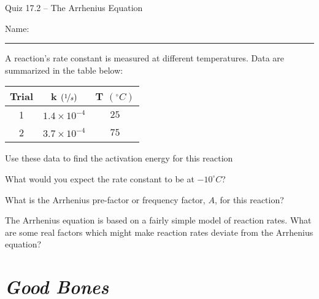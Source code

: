\documentclass[11pt, letterpaper]{memoir}
\begin{document}
	\begin{center}
		{\large Quiz 17.2 -- The Arrhenius Equation}
	\end{center}
	{\large Name: \rule[-1mm]{4in}{.1pt} 

\noindent 
A reaction's rate constant is measured at different temperatures. Data are summarized in the table below:

\begin{tabular}{ccc}	
	Trial & k $\left(\nicefrac{1}{s}\right)$ & T $\left(^\circ C\right)$ \\ \midrule \midrule
	1 &$1.4\times10^{-4}$&$25$\\ \midrule
	2 &$3.7\times10^{-4}$&$75$ \\ \midrule
\end{tabular}

\noindent Use these data to find the activation energy for this reaction

\vspace{8em}
\noindent What would you expect the rate constant to be at $-10^\circ C$?

\vspace{8em}
\noindent What is the Arrhenius pre-factor or frequency factor, $A$, for this reaction?


\vspace{8em}
\noindent The Arrhenius equation is based on a fairly simple model of reaction rates. What are some real factors which might make reaction rates deviate from the Arrhenius equation?

\newpage
\pagestyle{empty}
\addtocounter{page}{-1}	
\section*{\emph{Good Bones}}
}
\end{document}
